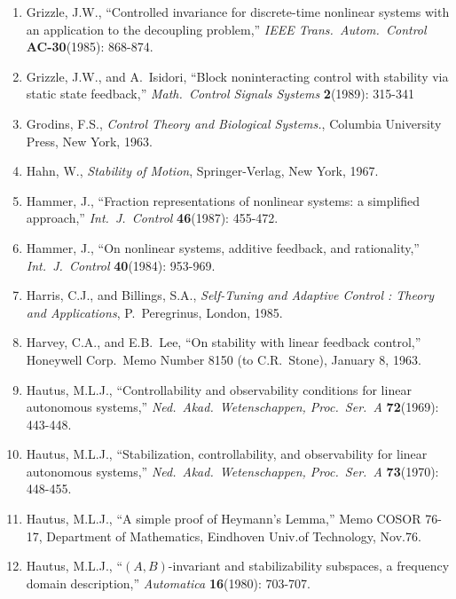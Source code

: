 \begin{enumerate}
\item
Grizzle, J.W., ``Controlled invariance for discrete-time nonlinear systems
with an application to the decoupling problem,'' {\it IEEE Trans.\ Autom.\
Control} {\bf AC-30}(1985): 868-874.

\item
Grizzle, J.W., and A.\ Isidori, ``Block noninteracting control with stability
via static state feedback,'' {\it Math.\ Control Signals Systems} {\bf
2}(1989): 315-341

\item
Grodins, F.S., {\it Control Theory and Biological Systems.}, Columbia
University Press, New York, 1963.

\item
Hahn, W., {\it Stability of Motion}, Springer-Verlag, New York, 1967.

\item
Hammer, J., ``Fraction representations of nonlinear systems: a simplified
approach,'' {\it Int.\ J.\ Control} {\bf 46}(1987): 455-472.

\item
Hammer, J., ``On nonlinear systems, additive feedback, and rationality,'' {\it
Int.\ J.\ Control} {\bf 40}(1984): 953-969.

\item
Harris, C.J., and Billings, S.A., {\it Self-Tuning and Adaptive Control :
Theory and Applications}, P.\ Peregrinus, London, 1985.

\item
Harvey, C.A., and E.B.\ Lee, ``On stability with linear feedback control,''
Honeywell Corp.\ Memo Number 8150 (to C.R.\ Stone), January 8, 1963.

\item
Hautus, M.L.J., ``Controllability and observability conditions for linear
autonomous systems,'' {\it Ned.\ Akad.\ Wetenschappen, Proc.\ Ser.\ A} {\bf
72}(1969): 443-448.

\item
Hautus, M.L.J., ``Stabilization, controllability, and observability for linear
autonomous systems,'' {\it Ned.\ Akad.\ Wetenschappen, Proc.\ Ser.\ A} {\bf
73}(1970): 448-455.

\item
Hautus, M.L.J., ``A simple proof of Heymann's Lemma,'' Memo COSOR 76-17,
Department of Mathematics, Eindhoven Univ.of Technology, Nov.76.

\item
Hautus, M.L.J., ``$(A,B)$-invariant and stabilizability subspaces, a frequency
domain description,'' {\it Automatica} {\bf 16}(1980): 703-707.


\end{enumerate}
